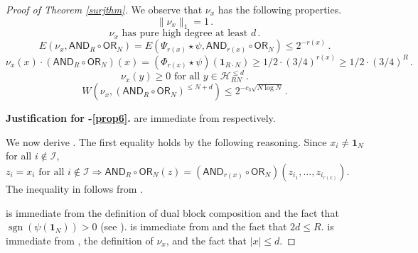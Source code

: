 \documentclass{toc}
\newcommand{\sgn}{\mathrm{sign}}
\newcommand{\OR}{\mathsf{ OR}}
\newcommand{\ls}{\star}
\newcommand{\Hcal}{\mathcal{H}}
\newcommand{\AND}{\mathsf{AND}}
\renewcommand{\sgn}{\operatorname{sgn}}
\begin{document}
\begin{proof}[Proof of Theorem \ref{surjthm}]
%
%
%
We observe that $\nu_x$ has the following properties. %
%
	\begin{equation}
	\label{prop1}
	\|\nu_x\|_1=1\,.
	\end{equation}
	\begin{equation}
	\label{prop2}
	\nu_x \text{ has pure high degree at least } d\,.
	\end{equation}
	\begin{equation} \label{prop3}
	E\left(\nu_x, \AND_R \circ \OR_N\right) = E\left(\Psi_{r(x)} \ls \psi, \AND_{r(x)} \circ \OR_N\right) \leq 2^{-r(x)}\,.
	\end{equation}
	\begin{equation} \label{prop4} 
	\nu_x(x)\cdot \left(\AND_R \circ \OR_N\right)(x) = \left(\Phi_{r(x)} \ls \psi\right)\left(\mathbf{1}_{R \cdot N}\right) \geq 1/2 \cdot (3/4)^{r(x)} \geq 1/2 \cdot (3/4)^{R}\,.
	\end{equation} 
	\begin{equation}
	\label{prop5} 
	\nu_x(y) \geq 0 \text{ for all } y \in \Hcal_{RN}^{\leq d}\,.
	\end{equation}
	\begin{equation}
	\label{prop6} 
	W\left(\nu_x, \left(\AND_R \circ \OR_N\right)^{\leq N + d}\right) \leq 2^{-c_3 \sqrt{N \log N}}\,.
	\end{equation}
	
	\medskip
\noindent \textbf{Justification for -\eqref{prop6}.} 
	  are immediate from   respectively.
	
	\medskip
	
	We now derive .
	The first equality holds by the following
	reasoning. Since $x_i \neq \mathbf{1}_N$ for all $i \not \in \mathcal{I}$,
	$z_i = x_i \text{ for all } i \notin \mathcal{I} \Longrightarrow 
	\AND_R \circ \OR_N(z) = \left(\AND_{r(x)} \circ \OR_N\right)(z_{i_1}, \dots, z_{i_{r(x)}})$. 
	The inequality in  follows from .
	
	
	\medskip {}
	is immediate from the definition of dual block composition and the fact that $\sgn(\psi(\mathbf{1}_N)) > 0$ (see 
	). 
	 is immediate from  and the fact that $2d \le R$.  is immediate from , the definition of $\nu_x$, and the fact that $|x| \leq d$. 
	

\end{proof}
\end{document}
